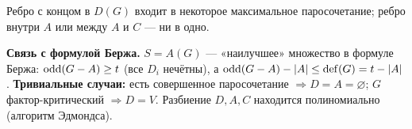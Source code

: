 
\begin{cor}
Ребро с концом в \(D(G)\) входит в некоторое максимальное паросочетание;
ребро внутри \(A\) или между \(A\) и \(C\) — ни в одно.
\end{cor}
\begin{tcolorbox}[colback=cbGrayBack,colframe=cbGray!55]
\textbf{Связь с формулой Бержа.} \(S=A(G)\) — «наилучшее» множество в формуле
Бержа: \(\operatorname{odd}(G-A)\ge t\) (все \(D_i\) нечётны), а \(\operatorname{odd}(G-A)-|A|\le\operatorname{def}(G)=t-|A|\).
\textbf{Тривиальные случаи:} есть совершенное паросочетание \(\Rightarrow D=A=\varnothing\);
\(G\) фактор-критический \(\Rightarrow D=V\). Разбиение \(D,A,C\) находится
полиномиально (алгоритм Эдмондса).
\end{tcolorbox}
